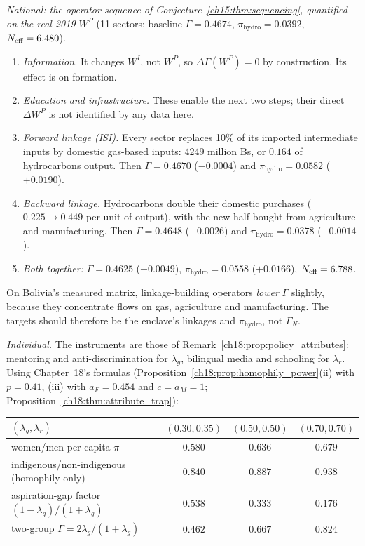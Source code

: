 \documentclass[../solutions_manual.tex]{subfiles}
\begin{document}
 \emph{National: the operator sequence of Conjecture~\ref{ch15:thm:sequencing}, quantified on the real 2019 $W^P$} (11 sectors; baseline $\Gamma = 0.4674$, $\pi_{\text{hydro}} = 0.0392$, $N_{\text{eff}} = 6.480$).
\begin{enumerate}
\item \emph{Information.} It changes $W^I$, not $W^P$, so $\Delta\Gamma(W^P) = 0$ by construction. Its effect is on formation.
\item \emph{Education and infrastructure.} These enable the next two steps; their direct $\Delta W^P$ is not identified by any data here.
\item \emph{Forward linkage (ISI).} Every sector replaces 10\% of its imported intermediate inputs by domestic gas-based inputs: 4249 million Bs, or $0.164$ of hydrocarbons output. Then $\Gamma = 0.4670$ ($-0.0004$) and $\pi_{\text{hydro}} = 0.0582$ ($+0.0190$).
\item \emph{Backward linkage.} Hydrocarbons double their domestic purchases ($0.225 \to 0.449$ per unit of output), with the new half bought from agriculture and manufacturing. Then $\Gamma = 0.4648$ ($-0.0026$) and $\pi_{\text{hydro}} = 0.0378$ ($-0.0014$).
\item \emph{Both together:} $\Gamma = 0.4625$ ($-0.0049$), $\pi_{\text{hydro}} = 0.0558$ ($+0.0166$), $N_{\text{eff}} = 6.788$.
\end{enumerate}
On Bolivia's measured matrix, linkage-building operators \emph{lower} $\Gamma$ slightly, because they concentrate flows on gas, agriculture and manufacturing. The targets should therefore be the enclave's linkages and $\pi_{\text{hydro}}$, not $\Gamma_N$.

 \emph{Individual.} The instruments are those of Remark~\ref{ch18:prop:policy_attributes}: mentoring and anti-discrimination for $\lambda_g$, bilingual media and schooling for $\lambda_r$. Using Chapter~18's formulas (Proposition~\ref{ch18:prop:homophily_power}(ii) with $p = 0.41$, (iii) with $a_F = 0.454$ and $c = a_M = 1$; Proposition~\ref{ch18:thm:attribute_trap}):
\begin{center}\small
\begin{tabular}{lccc}
\toprule
$(\lambda_g, \lambda_r)$ & $(0.30, 0.35)$ & $(0.50, 0.50)$ & $(0.70, 0.70)$ \\
\midrule
women/men per-capita $\pi$ & $0.580$ & $0.636$ & $0.679$ \\
indigenous/non-indigenous (homophily only) & $0.840$ & $0.887$ & $0.938$ \\
aspiration-gap factor $(1-\lambda_g)/(1+\lambda_g)$ & $0.538$ & $0.333$ & $0.176$ \\
two-group $\Gamma = 2\lambda_g/(1+\lambda_g)$ & $0.462$ & $0.667$ & $0.824$ \\
\bottomrule
\end{tabular}
\end{center}
\end{document}
